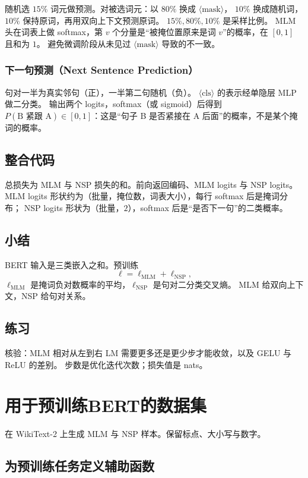 随机选 $15\%$ 词元做预测。对被选词元：以 $80\%$ 换成 $\langle\mathrm{mask}\rangle$，
$10\%$ 换成随机词，$10\%$ 保持原词，再用双向上下文预测原词。
$15\%,80\%,10\%$ 是采样比例。
MLM 头在词表上做 softmax，第 $v$ 个分量是“被掩位置原来是词 $v$”的概率，在 $[0,1]$ 且和为 $1$。
避免微调阶段从未见过 $\langle\mathrm{mask}\rangle$ 导致的不一致。

\subsubsection{下一句预测（Next Sentence Prediction）}

句对一半为真实邻句（正），一半第二句随机（负）。
$\langle\mathrm{cls}\rangle$ 的表示经单隐层 MLP 做二分类。
输出两个 logits，softmax（或 sigmoid）后得到
$P(\text{B 紧跟 A})\in[0,1]$：这是“句子 B 是否紧接在 A 后面”的概率，不是某个掩词的概率。

\subsection{整合代码}

总损失为 MLM 与 NSP 损失的和。前向返回编码、MLM logits 与 NSP logits。
MLM logits 形状约为（批量，掩位数，词表大小），每行 softmax 后是掩词分布；
NSP logits 形状为（批量，$2$），softmax 后是“是否下一句”的二类概率。

\subsection{小结}

BERT 输入是三类嵌入之和。预训练
\[
\ell=\ell_{\mathrm{MLM}}+\ell_{\mathrm{NSP}},
\]
$\ell_{\mathrm{MLM}}$ 是掩词负对数概率的平均，$\ell_{\mathrm{NSP}}$ 是句对二分类交叉熵。
MLM 给双向上下文，NSP 给句对关系。

\subsection{练习}

核验：MLM 相对从左到右 LM 需要更多还是更少步才能收敛，以及 GELU 与 ReLU 的差别。
步数是优化迭代次数；损失值是 nats。

\section{用于预训练BERT的数据集}

在 WikiText-2 上生成 MLM 与 NSP 样本。保留标点、大小写与数字。

\subsection{为预训练任务定义辅助函数}

